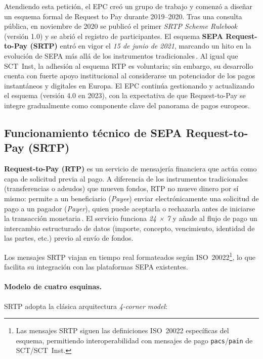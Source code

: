 Atendiendo esta petición, el EPC creó un grupo de trabajo y comenzó a diseñar un esquema formal de Request to Pay durante 2019–2020. Tras una consulta pública, en noviembre de 2020 se publicó el primer \emph{SRTP Scheme Rulebook} (versión 1.0) y se abrió el registro de participantes. El esquema \textbf{SEPA Request-to-Pay (SRTP)} entró en vigor el \textit{15 de junio de 2021}, marcando un hito en la evolución de SEPA más allá de los instrumentos tradicionales\,\cite{EBACLEARING2020}. Al igual que SCT~Inst, la adhesión al esquema RTP es voluntaria; sin embargo, su desarrollo cuenta con fuerte apoyo institucional al considerarse un potenciador de los pagos instantáneos y digitales en Europa. El EPC continúa gestionando y actualizando el esquema (versión 4.0 en 2023), con la expectativa de que Request-to-Pay se integre gradualmente como componente clave del panorama de pagos europeos.

\subsection{Funcionamiento técnico de SEPA Request-to-Pay (SRTP)}
\label{subsec:funcionamiento-srtp}

\textbf{Request-to-Pay (RTP)} es un servicio de mensajería financiera que actúa como capa de solicitud previa al pago. A diferencia de los instrumentos tradicionales (transferencias o adeudos) que mueven fondos, RTP no mueve dinero por sí mismo: permite a un beneficiario (\emph{Payee}) enviar electrónicamente una solicitud de pago a un pagador (\emph{Payer}), quien puede aceptarla o rechazarla antes de iniciarse la transacción monetaria\,\cite{EBACLEARING2020}. El servicio funciona \emph{24 × 7} y añade al flujo de pago un intercambio estructurado de datos (importe, concepto, vencimiento, identidad de las partes, etc.) previo al envío de fondos.  

Los mensajes SRTP viajan en tiempo real formateados según ISO~20022\footnote{Las mensajes SRTP siguen las definiciones ISO~20022 específicas del esquema, permitiendo interoperabilidad con mensajes de pago \texttt{pacs}/\texttt{pain} de SCT/SCT~Inst.}, lo que facilita su integración con las plataformas SEPA existentes.

\paragraph{Modelo de cuatro esquinas.} SRTP adopta la clásica arquitectura \emph{4-corner model}:

